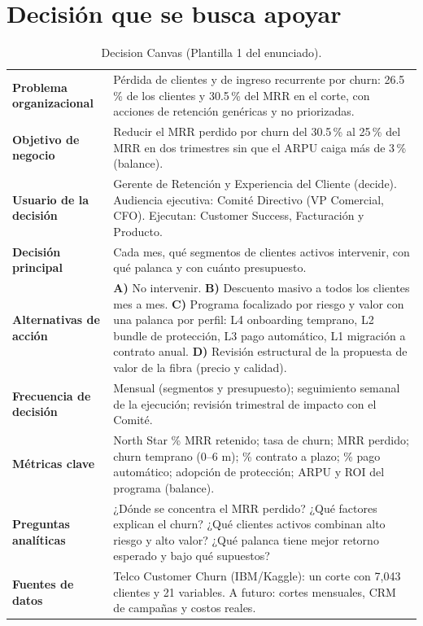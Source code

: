 \documentclass[10.5pt,a4paper]{article}
\begin{document}
\section{Decisión que se busca apoyar}
\begin{table}[H]
\centering\footnotesize
\caption{Decision Canvas (Plantilla 1 del enunciado).}
\begin{tabularx}{\textwidth}{@{}>{\bfseries}P{3.1cm}X@{}}
\toprule
Problema organizacional & Pérdida de clientes y de ingreso recurrente por churn: 26.5\,\% de los clientes y 30.5\,\% del MRR en el corte, con acciones de retención genéricas y no priorizadas. \\
Objetivo de negocio & Reducir el MRR perdido por churn del 30.5\,\% al 25\,\% del MRR en dos trimestres sin que el ARPU caiga más de 3\,\% (balance). \\
Usuario de la decisión & Gerente de Retención y Experiencia del Cliente (decide). Audiencia ejecutiva: Comité Directivo (VP Comercial, CFO). Ejecutan: Customer Success, Facturación y Producto. \\
Decisión principal & Cada mes, qué segmentos de clientes activos intervenir, con qué palanca y con cuánto presupuesto. \\
Alternativas de acción & \textbf{A)} No intervenir. \textbf{B)} Descuento masivo a todos los clientes mes a mes. \textbf{C)} Programa focalizado por riesgo y valor con una palanca por perfil: L4 onboarding temprano, L2 bundle de protección, L3 pago automático, L1 migración a contrato anual. \textbf{D)} Revisión estructural de la propuesta de valor de la fibra (precio y calidad). \\
Frecuencia de decisión & Mensual (segmentos y presupuesto); seguimiento semanal de la ejecución; revisión trimestral de impacto con el Comité. \\
Métricas clave & North Star \% MRR retenido; tasa de churn; MRR perdido; churn temprano (0–6 m); \% contrato a plazo; \% pago automático; adopción de protección; ARPU y ROI del programa (balance). \\
Preguntas analíticas & ¿Dónde se concentra el MRR perdido? ¿Qué factores explican el churn? ¿Qué clientes activos combinan alto riesgo y alto valor? ¿Qué palanca tiene mejor retorno esperado y bajo qué supuestos? \\
Fuentes de datos & Telco Customer Churn (IBM/Kaggle): un corte con 7,043 clientes y 21 variables. A futuro: cortes mensuales, CRM de campañas y costos reales. \\

\end{tabularx}
\end{table}
\end{document}
